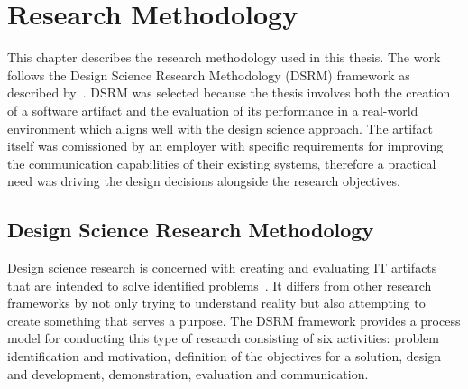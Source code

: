 \section{Research Methodology}
This chapter describes the research methodology used in this thesis. The work follows the Design Science Research Methodology (DSRM) framework as described by~\citet{DSRMethodology2007}. DSRM was selected because the thesis involves both the creation of a software artifact and the evaluation of its performance in a real-world environment which aligns well with the design science approach. The artifact itself was comissioned by an employer with specific requirements for improving the communication capabilities of their existing systems, therefore a practical need was driving the design decisions alongside the research objectives.
\subsection{Design Science Research Methodology}
Design science research is concerned with creating and evaluating IT artifacts that are intended to solve identified problems~\citep{DSRMethodology2007}. It differs from other research frameworks by not only trying to understand reality but also attempting to create something that serves a purpose. The DSRM framework provides a process model for conducting this type of research consisting of six activities: problem identification and motivation, definition of the objectives for a solution, design and development, demonstration, evaluation and communication.

